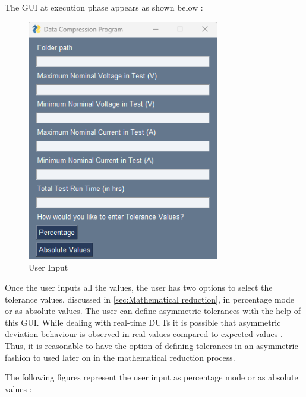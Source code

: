 The GUI at execution phase appears as shown below : 

\begin{figure}[h]
    	\centering
    	\includegraphics[width= 0.75\textwidth]{images/GUI-1.png}
    	\caption [GUI-I]{User Input}  
    	\label{fig:GUI1}
\end{figure}

Once the user inputs all the values, the user has two options to select the tolerance values, discussed in \ref{sec:Mathematical reduction}, in percentage mode or as absolute values. The user can define asymmetric tolerances with the help of this GUI. While dealing with real-time DUTs it is possible that asymmetric deviation behaviour is observed in real values compared to expected values . Thus, it is reasonable to have the option of defining tolerances in an asymmetric fashion to used later on in the mathematical reduction process.

The following figures represent the user input as percentage mode or as absolute values :


